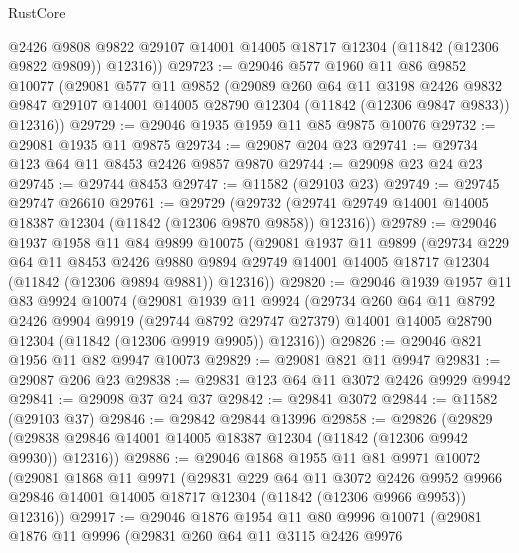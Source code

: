 \begin{lexlean}{RustCore}
\begin{coremodule}
        @2426
        @9808
        @9822
        @29107
        @14001
        @14005
        @18717
        @12304
        (@11842 (@12306 @9822 @9809))
        @12316))
@29723 := @29046
    @577
    @1960
    @11
    @86
    @9852
    @10077
    (@29081
      @577
      @11
      @9852
      (@29089
        @260
        @64
        @11
        @3198
        @2426
        @9832
        @9847
        @29107
        @14001
        @14005
        @28790
        @12304
        (@11842 (@12306 @9847 @9833))
        @12316))
@29729 := @29046 @1935 @1959 @11 @85 @9875 @10076
@29732 := @29081 @1935 @11 @9875
@29734 := @29087 @204 @23
@29741 := @29734 @123 @64 @11 @8453 @2426 @9857 @9870
@29744 := @29098 @23 @24 @23
@29745 := @29744 @8453
@29747 := @11582 (@29103 @23)
@29749 := @29745 @29747 @26610
@29761 := @29729
    (@29732 (@29741 @29749 @14001 @14005 @18387 @12304 (@11842 (@12306 @9870 @9858)) @12316))
@29789 := @29046
    @1937
    @1958
    @11
    @84
    @9899
    @10075
    (@29081
      @1937
      @11
      @9899
      (@29734
        @229
        @64
        @11
        @8453
        @2426
        @9880
        @9894
        @29749
        @14001
        @14005
        @18717
        @12304
        (@11842 (@12306 @9894 @9881))
        @12316))
@29820 := @29046
    @1939
    @1957
    @11
    @83
    @9924
    @10074
    (@29081
      @1939
      @11
      @9924
      (@29734
        @260
        @64
        @11
        @8792
        @2426
        @9904
        @9919
        (@29744 @8792 @29747 @27379)
        @14001
        @14005
        @28790
        @12304
        (@11842 (@12306 @9919 @9905))
        @12316))
@29826 := @29046 @821 @1956 @11 @82 @9947 @10073
@29829 := @29081 @821 @11 @9947
@29831 := @29087 @206 @23
@29838 := @29831 @123 @64 @11 @3072 @2426 @9929 @9942
@29841 := @29098 @37 @24 @37
@29842 := @29841 @3072
@29844 := @11582 (@29103 @37)
@29846 := @29842 @29844 @13996
@29858 := @29826
    (@29829 (@29838 @29846 @14001 @14005 @18387 @12304 (@11842 (@12306 @9942 @9930)) @12316))
@29886 := @29046
    @1868
    @1955
    @11
    @81
    @9971
    @10072
    (@29081
      @1868
      @11
      @9971
      (@29831
        @229
        @64
        @11
        @3072
        @2426
        @9952
        @9966
        @29846
        @14001
        @14005
        @18717
        @12304
        (@11842 (@12306 @9966 @9953))
        @12316))
@29917 := @29046
    @1876
    @1954
    @11
    @80
    @9996
    @10071
    (@29081
      @1876
      @11
      @9996
      (@29831
        @260
        @64
        @11
        @3115
        @2426
        @9976

\end{coremodule}
\end{lexlean}
